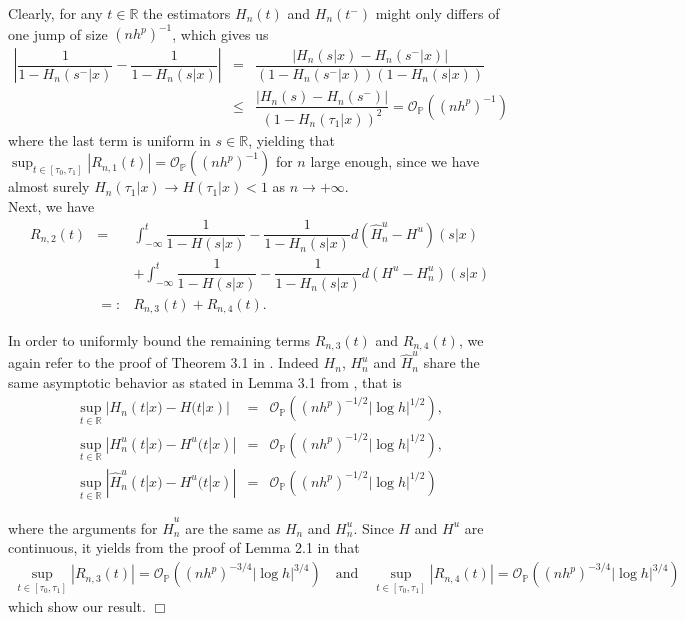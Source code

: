 \documentclass[12pt]{article}
\begin{document}
Clearly, for any $t\in\mathbb{R}$ the estimators $H_n(t)$ and $H_n(t^-)$ might only differs of one jump of size $(nh^p)^{-1}$, which gives us
\begin{eqnarray*}
\left|\dfrac{1}{1-H_n(s^-|x)}-\dfrac{1}{1-H_n(s|x)}\right|&=&\dfrac{\left|H_n(s|x)-H_n(s^-|x)\right|}{(1-H_n(s^-|x))(1-H_n(s|x))}\\
&\leq& \dfrac{\left|H_n(s)-H_n(s^-)\right|}{(1-H_n(\tau_1|x))^2}=\mathcal{O}_\mathbb{P}((nh^p)^{-1})
\end{eqnarray*}
where the last term is uniform in $s\in\mathbb{R}$, yielding that $\sup_{t\in[\tau_0,\tau_1]}|R_{n,1}(t)|=\mathcal{O}_\mathbb{P}((nh^p)^{-1})$ for $n$ large enough, since we have almost surely $H_n(\tau_1|x)\to H(\tau_1|x)<1$ as $n\to+\infty$.\\ 

Next, we have
\begin{eqnarray*}
R_{n,2}(t)&=&\int_{-\infty}^t\dfrac{1}{1-H(s|x)}-\dfrac{1}{1-H_n(s|x)}d(\widehat{H}_n^u-H^u)(s|x)\\
&&+\int_{-\infty}^t\dfrac{1}{1-H(s|x)}-\dfrac{1}{1-H_n(s|x)}d(H^u-H^u_n)(s|x)\\
&=:&R_{n,3}(t)+R_{n,4}(t).
\end{eqnarray*}

In order to uniformly bound the remaining terms $R_{n,3}(t)$ and $R_{n,4}(t)$, we again refer to the proof of Theorem 3.1 in \cite{Escobar2019}. Indeed $H_n$, $H_n^u$ and $\widehat{H}_n^u$ share the same asymptotic behavior as stated in Lemma 3.1 from \cite{Escobar2019}, that is 
\begin{eqnarray*}
\label{rate1}
\sup_{t\in\mathbb{R}}|H_n(t|x)-H(t|x)|&=&\mathcal{O}_\mathbb{P}\left((nh^p)^{-1/2}|\log h|^{1/2}\right),\nonumber\\
\sup_{t\in\mathbb{R}}|H^u_n(t|x)-H^u(t|x)|&=&\mathcal{O}_\mathbb{P}\left((nh^p)^{-1/2}|\log h|^{1/2}\right),\\
\sup_{t\in\mathbb{R}}|\widehat{H}^u_n(t|x)-H^u(t|x)|&=&\mathcal{O}_\mathbb{P}\left((nh^p)^{-1/2}|\log h|^{1/2}\right)\nonumber
\end{eqnarray*}

where the arguments for $\widehat{H}^u_n$ are the same as $H_n$ and $H^u_n$. Since $H$ and $H^u$ are continuous, it yields from the proof of Lemma 2.1 in \cite{VanKeilegom1997} that
\begin{eqnarray*}
\sup_{t\in[\tau_0,\tau_1]}|R_{n,3}(t)|=\mathcal{O}_\mathbb{P}((nh^p)^{-3/4} |\log h|^{3/4})\quad\text{and}\quad\sup_{t\in[\tau_0,\tau_1]}|R_{n,4}(t)|=\mathcal{O}_\mathbb{P}((nh^p)^{-3/4} |\log h|^{3/4})
\end{eqnarray*}
which show our result.
\hfill$\Box$\\
\end{document}
